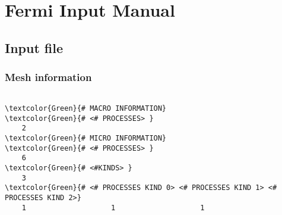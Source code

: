 \chapter*{Fermi Input Manual}




\section{Input file}

\subsection{Mesh information}

\begin{Verbatim}[frame=single,commandchars=\\\{\}]

\textcolor{Green}{# MACRO INFORMATION}
\textcolor{Green}{# <# PROCESSES> }
    2  
\textcolor{Green}{# MICRO INFORMATION}
\textcolor{Green}{# <# PROCESSES> }
    6  
\textcolor{Green}{# <#KINDS> }
    3
\textcolor{Green}{# <# PROCESSES KIND 0> <# PROCESSES KIND 1> <# PROCESSES KIND 2>}
    1                    1                    1
\end{Verbatim}





